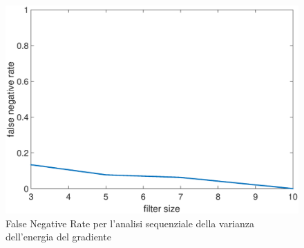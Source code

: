 \begin{figure}[tb]
\centering
\includegraphics[width=13cm]{diagrammi/FNR}
\caption{False Negative Rate per l'analisi sequenziale della varianza dell'energia del gradiente}
\label{fig:FNR}
\end{figure}
